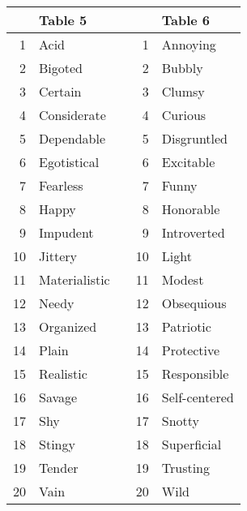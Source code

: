 \documentclass[12pt]{article}
\begin{document}
\begin{tabular}{r|l l r|l}
 & Table 5 & & & Table 6 \\\hline
 1 & Acid & &  1 & Annoying\\
 2 & Bigoted & &  2 & Bubbly\\
 3 & Certain & &  3 & Clumsy\\
 4 & Considerate & &  4 & Curious\\
 5 & Dependable & &  5 & Disgruntled\\
 6 & Egotistical & &  6 & Excitable\\
 7 & Fearless & &  7 & Funny\\
 8 & Happy & &  8 & Honorable\\
 9 & Impudent & &  9 & Introverted\\
10 & Jittery & & 10 & Light\\
11 & Materialistic & & 11 & Modest\\
12 & Needy & & 12 & Obsequious\\
13 & Organized & & 13 & Patriotic\\
14 & Plain & & 14 & Protective\\
15 & Realistic & & 15 & Responsible\\
16 & Savage & & 16 & Self-centered\\
17 & Shy & & 17 & Snotty\\
18 & Stingy & & 18 & Superficial\\
19 & Tender & & 19 & Trusting\\
20 & Vain & & 20 & Wild\\
\end{tabular}
\end{document}
